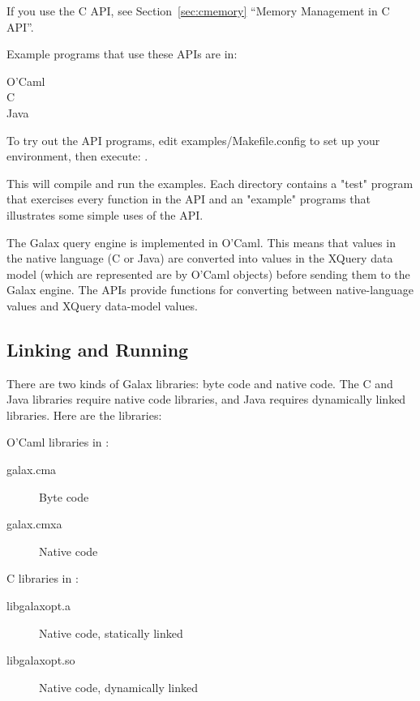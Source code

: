   If you use the C API, see Section~\ref{sec:cmemory} ``Memory Management in C API''.

  Example programs that use these APIs are in:
  
\begin{description}
\item[O'Caml] 
\item[C]      
\item[Java]   
\end{description}

To try out the API programs, edit examples/Makefile.config to set up your environment, then
execute: . 

This will compile and run the examples.  Each directory contains a "test"
program that exercises every function in the API and an "example"
programs that illustrates some simple uses of the API.

  The Galax query engine is implemented in O'Caml.  This means that
  values in the native language (C or Java) are converted into
  values in the XQuery data model (which are represented are by O'Caml
  objects) before sending them to the Galax engine.  The APIs provide
  functions for converting between native-language values and XQuery
  data-model values.

\subsection{Linking and Running}

  There are two kinds of Galax libraries: byte code and native code. 
  The C and Java libraries require native code libraries, and Java
  requires dynamically linked libraries.  Here are the libraries:

O'Caml libraries in :
\begin{description}
\item[galax.cma]      Byte code
\item[galax.cmxa]     Native code
\end{description}


C libraries in :
\begin{description}
\item[libgalaxopt.a]   Native code, statically linked
\item[libgalaxopt.so]  Native code, dynamically linked
\end{description}



